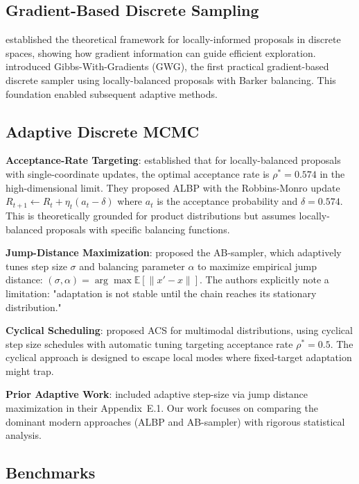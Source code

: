 \documentclass{article}
\begin{document}
\subsection{Gradient-Based Discrete Sampling}

\citet{zanella2020informed} established the theoretical framework for locally-informed proposals in discrete spaces, showing how gradient information can guide efficient exploration. \citet{grathwohl2021oops} introduced Gibbs-With-Gradients (GWG), the first practical gradient-based discrete sampler using locally-balanced proposals with Barker balancing. This foundation enabled subsequent adaptive methods.

\subsection{Adaptive Discrete MCMC}

\textbf{Acceptance-Rate Targeting}: \citet{sun2022optimal} established that for locally-balanced proposals with single-coordinate updates, the optimal acceptance rate is $\rho^* = 0.574$ in the high-dimensional limit. They proposed ALBP with the Robbins-Monro update $R_{t+1} \leftarrow R_t + \eta_t(a_t - \delta)$ where $a_t$ is the acceptance probability and $\delta = 0.574$. This is theoretically grounded for product distributions but assumes locally-balanced proposals with specific balancing functions.

\textbf{Jump-Distance Maximization}: \citet{sun2023anyscale} proposed the AB-sampler, which adaptively tunes step size $\sigma$ and balancing parameter $\alpha$ to maximize empirical jump distance: $(\sigma, \alpha) = \arg\max \mathbb{E}[\|x' - x\|]$. The authors explicitly note a limitation: "adaptation is not stable until the chain reaches its stationary distribution."

\textbf{Cyclical Scheduling}: \citet{pynadath2024gradient} proposed ACS for multimodal distributions, using cyclical step size schedules with automatic tuning targeting acceptance rate $\rho^* = 0.5$. The cyclical approach is designed to escape local modes where fixed-target adaptation might trap.

\textbf{Prior Adaptive Work}: \citet{rhodes2022enhanced} included adaptive step-size via jump distance maximization in their Appendix~E.1. Our work focuses on comparing the dominant modern approaches (ALBP and AB-sampler) with rigorous statistical analysis.

\subsection{Benchmarks}
\end{document}
